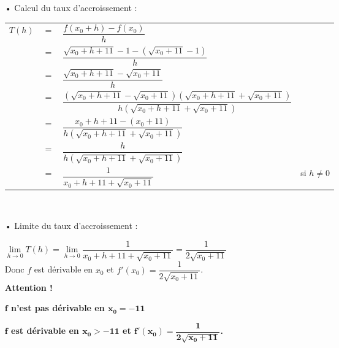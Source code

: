 \begin{itemize}
\item[•] Calcul du taux d'accroissement : \vspace*{.3cm}
\\
\begin{tabular}{llll}
$T(h)$ & $=$ & $\dfrac{f(x_0 + h) - f(x_0)}{h}$ & \vspace*{.3cm} \\
& $=$ & $\dfrac{\sqrt{x_0 + h + 11} - 1 -\left( \sqrt{x_0 +11} - 1\right)}{h}$ & \vspace*{.3cm} \\
& $=$ & $\dfrac{\sqrt{x_0 + h + 11} - \sqrt{x_0 + 11}}{h}$ & \vspace*{.3cm} \\
& $=$ & $\dfrac{\left(\sqrt{x_0 + h + 11} - \sqrt{x_0 + 11}\right)\left(\sqrt{x_0 + h + 11} + \sqrt{x_0 + 11}\right)}{h\left(\sqrt{x_0 + h + 11} + \sqrt{x_0 + 11}\right)}$ & \vspace*{.3cm} \\
& $=$ & $\dfrac{x_0 + h + 11 - \left(x_0 + 11\right)}{h\left(\sqrt{x_0 + h + 11} + \sqrt{x_0 + 11}\right)}$ & \vspace*{.3cm} \\
& $=$ & $\dfrac{h}{h\left(\sqrt{x_0 + h + 11} + \sqrt{x_0 + 11}\right)}$ & \vspace*{.3cm} \\
& $=$ & $\dfrac{1}{{x_0 + h + 11} + \sqrt{x_0 + 11}}$ & si $h \neq 0$ \\
\end{tabular} \\
\vspace*{.3cm}

\item[•] Limite du taux d'accroissement : \vspace*{.3cm}

$\lim\limits_{h \to 0} T(h) = \lim\limits_{h \to 0} \dfrac{1}{{x_0 + h + 11} + \sqrt{x_0 + 11}} = \dfrac{1}{2\sqrt{x_0 +11}}$ \vspace*{.3cm} \\

Donc $f$ est dérivable en $x_0$ et $f'(x_0) = \dfrac{1}{2\sqrt{x_0 + 11}}$. \\

\textbf{Attention !} 

\textbf{$\mathbf{f}$ n'est pas dérivable en $\mathbf{x_0 = -11}$} 

\textbf{$\mathbf{f}$ est dérivable en $\mathbf{x_0 > -11}$ et $\mathbf{f'(x_0) = \dfrac{1}{2\sqrt{x_0 + 11}}}$.} \\


\end{itemize}

